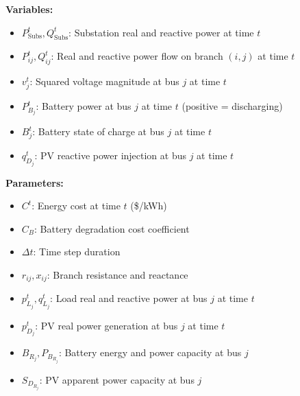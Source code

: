 \textbf{Variables:}
\begin{itemize}
    \item $P^t_{\text{Subs}}, Q^t_{\text{Subs}}$: Substation real and reactive power at time $t$
    \item $P_{ij}^t, Q_{ij}^t$: Real and reactive power flow on branch $(i,j)$ at time $t$
    \item $v_j^t$: Squared voltage magnitude at bus $j$ at time $t$
    \item $P_{B_j}^t$: Battery power at bus $j$ at time $t$ (positive = discharging)
    \item $B_j^t$: Battery state of charge at bus $j$ at time $t$
    \item $q_{D_j}^t$: PV reactive power injection at bus $j$ at time $t$
\end{itemize}

\textbf{Parameters:}
\begin{itemize}
    \item $C^t$: Energy cost at time $t$ (\$/kWh)
    \item $C_B$: Battery degradation cost coefficient
    \item $\Delta t$: Time step duration
    \item $r_{ij}, x_{ij}$: Branch resistance and reactance
    \item $p_{L_j}^t, q_{L_j}^t$: Load real and reactive power at bus $j$ at time $t$
    \item $p_{D_j}^t$: PV real power generation at bus $j$ at time $t$
    \item $B_{R_j}, P_{B_{R_j}}$: Battery energy and power capacity at bus $j$
    \item $S_{D_{R_j}}$: PV apparent power capacity at bus $j$
\end{itemize}